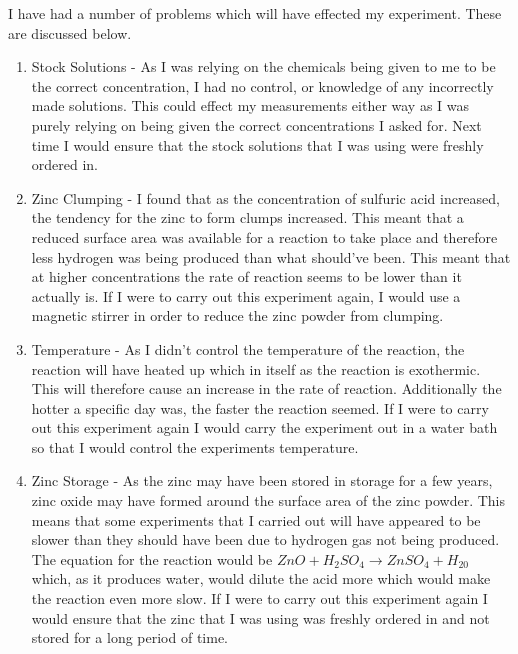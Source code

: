 I have had a number of problems which will have effected my experiment. These are discussed below.

\begin{enumerate}
\item Stock Solutions - As I was relying on the chemicals being given to me to be the correct concentration, I had no control, or knowledge of any incorrectly made solutions. This could effect my measurements either way as I was purely relying on being given the correct concentrations I asked for. Next time I would ensure that the stock solutions that I was using were freshly ordered in.

\item Zinc Clumping - I found that as the concentration of sulfuric acid increased, the tendency for the zinc to form clumps increased. This meant that a reduced surface area was available for a reaction to take place and therefore less hydrogen was being produced than what should've been. This meant that at higher concentrations the rate of reaction seems to be lower than it actually is. If I were to carry out this experiment again, I would use a magnetic stirrer in order to reduce the zinc powder from clumping.

\item Temperature - As I didn't control the temperature of the reaction, the reaction will have heated up which in itself as the reaction is exothermic. This will therefore cause an increase in the rate of reaction. Additionally the hotter a specific day was, the faster the reaction seemed. If I were to carry out this experiment again I would carry the experiment out in a water bath so that I would control the experiments temperature.

\item Zinc Storage - As the zinc may have been stored in storage for a few years, zinc oxide may have formed around the surface area of the zinc powder. This means that some experiments that I carried out will have appeared to be slower than they should have been due to hydrogen gas not being produced. The equation for the reaction would be $ZnO + H_2SO_4 \rightarrow ZnSO_4 + H_20$ which, as it produces water, would dilute the acid more which would make the reaction even more slow. If I were to carry out this experiment again I would ensure that the zinc that I was using was freshly ordered in and not stored for a long period of time.


\end{enumerate}
